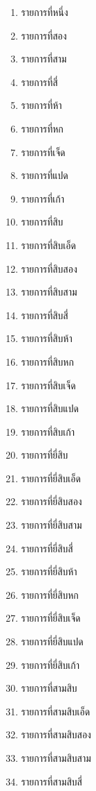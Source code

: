\documentclass[11pt]{ltxguide}
\begin{document}
\begin{multicols}{4}
    \scriptsize
    \begin{enumerate}[listparindent=0pc,topsep=0pc,itemsep=0pc,label={\thaialph*.}]
        \item  รายการที่หนึ่ง
        \item  รายการที่สอง
        \item  รายการที่สาม
        \item  รายการที่สี่
        \item  รายการที่ห้า
        \item  รายการที่หก
        \item  รายการที่เจ็ด
        \item  รายการที่แปด
        \item  รายการที่เก้า
        \item  รายการที่สิบ
        \item  รายการที่สิบเอ็ด
        \item  รายการที่สิบสอง
        \item  รายการที่สิบสาม
        \item  รายการที่สิบสี่
        \item  รายการที่สิบห้า
        \item  รายการที่สิบหก
        \item  รายการที่สิบเจ็ด
        \item  รายการที่สิบแปด
        \item  รายการที่สิบเก้า
        \item  รายการที่ยี่สิบ
        \item  รายการที่ยี่สิบเอ็ด
        \item  รายการที่ยี่สิบสอง
        \item  รายการที่ยี่สิบสาม
        \item  รายการที่ยี่สิบสี่
        \item  รายการที่ยี่สิบห้า
        \item  รายการที่ยี่สิบหก
        \item  รายการที่ยี่สิบเจ็ด
        \item  รายการที่ยี่สิบแปด
        \item  รายการที่ยี่สิบเก้า
        \item  รายการที่สามสิบ
        \item  รายการที่สามสิบเอ็ด
        \item  รายการที่สามสิบสอง
        \item  รายการที่สามสิบสาม
        \item  รายการที่สามสิบสี่

\end{enumerate}
\end{multicols}
\end{document}
